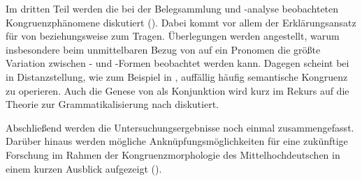 Im dritten Teil werden die bei der Belegsammlung und -analyse beobachteten
Kongruenzphänomene diskutiert (). Dabei kommt vor allem
der Erklärungsansatz für  von
\citet[171--195]{wechslerzlatic2003} beziehungsweise \citet{wechsler2009} zum
Tragen. Überlegungen werden angestellt, warum insbesondere beim unmittelbaren
Bezug von  auf ein Pronomen die größte Variation zwischen
- und -\allowbreak{}Formen beobachtet werden kann.
Dagegen scheint bei  in Dis\-tanz\-stellung, wie zum Beispiel in
, auffällig häufig
semantische Kongruenz zu operieren. Auch die Genese
von  als Konjunktion wird kurz im Rekurs auf die Theorie zur
Grammatikalisierung nach \citet{lehmann2015} diskutiert.

Abschließend werden die Untersuchungsergebnisse noch einmal zusammengefasst.
Darüber hinaus werden mögliche Anknüpfungsmöglichkeiten für eine zukünftige
Forschung im Rahmen der Kongruenzmorphologie des Mittel\-hoch\-deutschen in
einem kurzen Ausblick aufgezeigt ().
